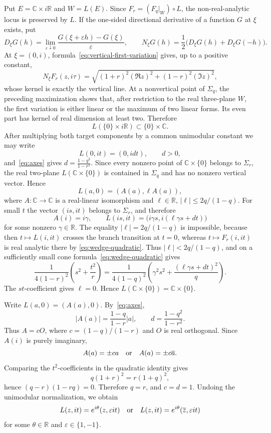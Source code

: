 \documentclass[12pt]{amsart}
\newcommand{\CC}{\mathbb C}
\newcommand{\RR}{\mathbb R}
\begin{document}
Put $E=\CC\times i\RR$ and $W=L(E)$. Since
$F_r=(F_q|_W)\circ L$, the non-real-analytic locus is preserved by $L$.
If the one-sided directional derivative of a function $G$ at $\xi$ exists,
put
\[
 D_\xi G(h)=\lim_{\varepsilon\downarrow0}
 \frac{G(\xi+\varepsilon h)-G(\xi)}{\varepsilon},
 \qquad
 N_\xi G(h)=\frac12\bigl(D_\xi G(h)+D_\xi G(-h)\bigr).
\]
At $\xi=(0,i)$, formula~\eqref{eq:vertical-first-variation} gives, up to a
positive constant,
\[
 N_\xi F_r(z,i\tau)=
 \sqrt{(1+r)^2(\Re z)^2+(1-r)^2(\Im z)^2},
\]
whose kernel is exactly the vertical line. At a nonvertical point of
$\Sigma_q$, the preceding maximization shows that, after restriction to the
real three-plane $W$, the first variation is either linear or the maximum of
two linear forms. Its even part has kernel of real dimension at least two.
Therefore
\[
 L(\{0\}\times i\RR)\subset\{0\}\times\CC.
\]
After multiplying both target components by a common unimodular constant we
may write
\[
 L(0,it)=(0,idt),\qquad d>0,
\]
and~\eqref{eq:axes} gives $d=\frac{1-q^2}{1-r^2}$.
Since every nonzero point of $\CC\times\{0\}$ belongs to $\Sigma_r$, the
real two-plane $L(\CC\times\{0\})$ is contained in $\Sigma_q$ and has no
nonzero vertical vector. Hence
\[
 L(a,0)=(A(a),\ell A(a)),
\]
where $A:\CC\to\CC$ is a real-linear isomorphism and
$\ell\in\RR$, $|\ell|\le2q/(1-q)$. For small $t$ the vector
$(is,it)$ belongs to $\Sigma_r$, and therefore
\[
 A(i)=i\gamma,
 \qquad
 L(is,it)=\bigl(i\gamma s,i(\ell\gamma s+dt)\bigr)
\]
for some nonzero $\gamma\in\RR$. The equality
$|\ell|=2q/(1-q)$ is impossible, because then
$t\mapsto L(i,it)$ crosses the branch transition at $t=0$, whereas
$t\mapsto F_r(i,it)$ is real analytic there by
\eqref{eq:wedge-quadratic}. Thus $|\ell|<2q/(1-q)$, and on a sufficiently
small cone formula~\eqref{eq:wedge-quadratic} gives
\[
\frac1{4(1-r)^2}
\left(s^2+\frac{t^2}{r}\right)
=
\frac1{4(1-q)^2}
\left(
\gamma^2s^2+\frac{(\ell\gamma s+dt)^2}{q}
\right).
\]
The $st$-coefficient gives $\ell=0$. Hence
$L(\CC\times\{0\})=\CC\times\{0\}$.

Write $L(a,0)=(A(a),0)$. By~\eqref{eq:axes},
\[
 |A(a)|=\frac{1-q}{1-r}|a|,
 \qquad
 d=\frac{1-q^2}{1-r^2}.
\]
Thus $A=cO$, where $c=(1-q)/(1-r)$ and $O$ is real orthogonal. Since
$A(i)$ is purely imaginary,
\[
 A(a)=\pm ca\quad\hbox{or}\quad A(a)=\pm c\overline a.
\]
Comparing the $t^2$-coefficients in the quadratic identity gives
\[
 q(1+r)^2=r(1+q)^2,
\]
hence $(q-r)(1-rq)=0$. Therefore $q=r$, and $c=d=1$. Undoing the
unimodular normalization, we obtain
\[
 L(z,it)=e^{i\theta}(z,\varepsilon it)
 \quad\hbox{or}\quad
 L(z,it)=e^{i\theta}(\overline z,\varepsilon it)
\]
for some $\theta\in\RR$ and $\varepsilon\in\{1,-1\}$.
\end{document}
